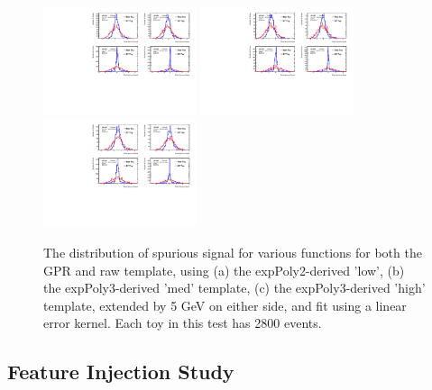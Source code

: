 \begin{figure} 
\begin{center}
  \includegraphics[width=0.4\textwidth]{figures/background/gpr/validation/linear/ToyTest_FitSigVals_lowpT_2800_noSig}   
  \includegraphics[width=0.4\textwidth]{figures/background/gpr/validation/linear/ToyTest_FitSigVals_medpT_2800_noSig}   
  \includegraphics[width=0.4\textwidth]{figures/background/gpr/validation/linear/ToyTest_FitSigVals_highpT_2800_noSig}   
\caption{The distribution of spurious signal for various functions for both the GPR and raw template, using (a) the expPoly2-derived 'low', (b) the expPoly3-derived 'med' template, (c) the expPoly3-derived 'high' template, extended by 5 GeV on either side, and fit using a linear error kernel. Each toy in this test has 2800 events.}
\label{fig:linearkernel_lowpt_2800_noSig}
\end{center}
\end{figure}

\clearpage


\subsection{Feature Injection Study}

